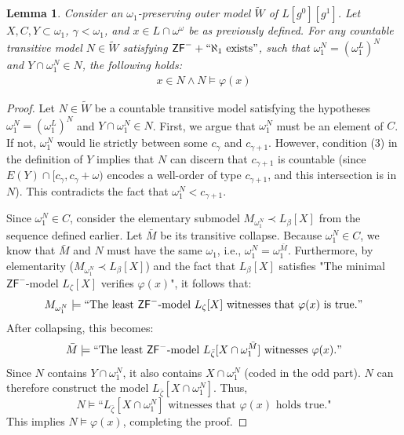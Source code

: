 \documentclass[a4paper,11pt]{article}
\newtheorem{lemma}[theorem]{Lemma}
\newcommand{\ZFP}{\mathsf{ZF}^-}
\begin{document}
\begin{lemma}
Consider an $\omega_1$-preserving outer model $\tilde{W}$ of $L[g^0][g^1]$. Let $X, C, Y \subset \omega_1$, $\gamma < \omega_1$, and $x \in L \cap \omega^{\omega}$ be as previously defined. For any countable transitive model $N \in \tilde{W}$ satisfying $\ZFP + ``\aleph_1 \text{ exists}"$, such that $\omega_1^N = (\omega_1^L)^N$ and $Y \cap \omega_1^N \in N$, the following holds:
\begin{align*}
 x \in N \land N \models \varphi(x)
\end{align*}
\end{lemma}

\begin{proof}
Let $N \in \tilde{W}$ be a countable transitive model satisfying the hypotheses $\omega_1^N = (\omega_1^L)^N$ and $Y \cap \omega_1^N \in N$.
First, we argue that $\omega_1^N$ must be an element of $C$. If not, $\omega_1^N$ would lie strictly between some $c_{\gamma}$ and $c_{\gamma+1}$. However, condition (3) in the definition of $Y$ implies that $N$ can discern that $c_{\gamma+1}$ is countable (since $E(Y) \cap [c_\gamma, c_\gamma + \omega)$ encodes a well-order of type $c_{\gamma+1}$, and this intersection is in $N$). This contradicts the fact that $\omega_1^N < c_{\gamma+1}$.

Since $\omega_1^N \in C$, consider the elementary submodel $M_{\omega_1^N} \prec L_{\beta}[X]$ from the sequence defined earlier. Let $\bar{M}$ be its transitive collapse.
Because $\omega_1^N \in C$, we know that $\bar{M}$ and $N$ must have the same $\omega_1$, i.e., $\omega_1^N = \omega_1^{\bar{M}}$. Furthermore, by elementarity ($M_{\omega_1^N} \prec L_{\beta}[X]$) and the fact that $L_{\beta}[X]$ satisfies "The minimal $\ZFP$-model $L_{\zeta}[X]$ verifies $\varphi(x)$", it follows that:
\[ M_{\omega_1^N} \models \text{``The least } \ZFP\text{-model } L_{\zeta}[X] \text{ witnesses that } \varphi(x) \text{ is true}." \]
After collapsing, this becomes:
\[ \bar{M} \models \text{``The least } \ZFP\text{-model } L_{\bar{\zeta}}[ X \cap \omega_1^{\bar{M}}] \text{ witnesses } \varphi(x)." \]
Since $N$ contains $Y \cap \omega_1^N$, it also contains $X \cap \omega_1^N$ (coded in the odd part). $N$ can therefore construct the model $L_{\bar{\zeta}}[X \cap \omega_1^N]$. Thus,
\[ N \models \text{``} L_{\bar{\zeta}}[X \cap \omega_1^{N}] \text{ witnesses that } \varphi(x) \text{ holds true."} \]
This implies $N \models \varphi(x)$, completing the proof.
\end{proof}
\end{document}
